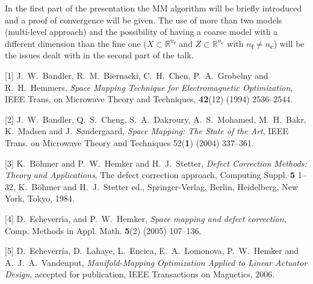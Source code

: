 \documentclass{report}
\newcommand{\Reals}{\mathbb{R}}
\begin{document}
In the first part of the presentation the MM algorithm will
be briefly introduced and a proof of convergence will be
given. The use of more than two models (multi-level
approach) and the possibility of having a coarse model with
a different dimension than the fine one
($X \subset \Reals^{n_{\mathbf f}}$
and $Z \subset \Reals^{n_{\mathbf c}}$ with
$n_{\mathbf f} \neq n_{\mathbf c}$)
will be the issues dealt with in the second part of
the talk.

[1]
J.~W.~Bandler, R.~M.~Biernacki,
C.~H.~Chen, P.~A.~Grobelny and R.~H.~Hemmers,
{\em Space
Mapping Technique for Electromagnetic Optimization},
IEEE Trans. on Microwave Theory and Techniques,
{\bf 42}(12) (1994) 2536--2544.

[2]
J.~W.~Bandler, Q.~S.~Cheng, S.~A.~Dakroury, A.~S.~Mohamed,
M.~H.~Bakr, K.~Madsen and J.~S{\o}ndergaard,
{\em Space Mapping: The State of the Art},
IEEE Trans. on
Microwave Theory and Techniques 52({\bf 1}) (2004)
337--361.

[3]
K.~B{\"o}hmer and P.~W.~Hemker and H.~J.~Stetter,
{\em Defect Correction Methods: Theory and
Applications}, The defect correction approach,
Computing Suppl. {\bf 5} 1--32,
K.~B{\"o}hmer and H.~J.~Stetter ed.,
Springer-Verlag, Berlin, Heidelberg, New York, Tokyo, 1984.

[4]
D.~Echeverr\'{\i}a, and P.~W.~Hemker,
{\em Space mapping and defect correction},
Comp. Methods in Appl. Math. {\bf 5}(2) (2005) 107--136.

[5]
D.~Echeverr\'{i}a, D.~Lahaye, L.~Encica,
E.~A.~Lomonova, P.~W.~Hemker and A.~J.~A.~Vandenput,
{\em Manifold-Mapping Optimization Applied to Linear
Actuator Design},
accepted for publication,
IEEE Transactions on Magnetics, 2006.



\end{document}
